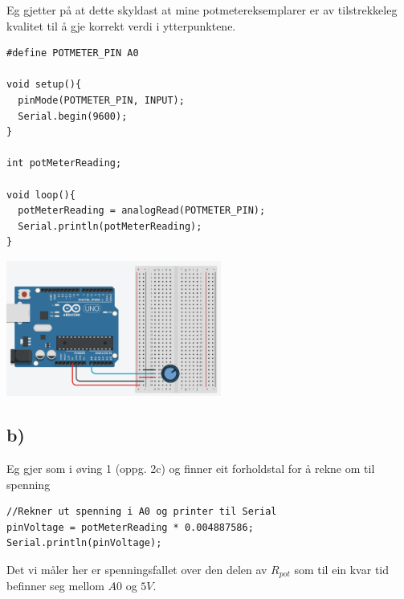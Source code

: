 \documentclass[12pt,a4paper]{article}
\begin{document}
    Eg gjetter på at dette skyldast at mine potmetereksemplarer er av tilstrekkeleg kvalitet til
    å gje korrekt verdi i ytterpunktene.
    
    \begin{lstlisting}[language=Arduino, basicstyle=\small]
#define POTMETER_PIN A0

void setup(){
  pinMode(POTMETER_PIN, INPUT);
  Serial.begin(9600);
}

int potMeterReading;

void loop(){
  potMeterReading = analogRead(POTMETER_PIN);
  Serial.println(potMeterReading);
}
    \end{lstlisting}
    \begin{center}
      \includegraphics[width=200pt]{01_2_b.png}
    \end{center}

    \subsection*{b)}
    Eg gjer som i øving 1 (oppg. 2c) og finner eit forholdstal for å rekne om til spenning
    \begin{lstlisting}[language=Arduino, basicstyle=\small]
//Rekner ut spenning i A0 og printer til Serial
pinVoltage = potMeterReading * 0.004887586;
Serial.println(pinVoltage);
    \end{lstlisting}
  Det vi måler her er spenningsfallet over den delen av $R_{pot}$ som til ein kvar
  tid befinner seg mellom $A0$ og $5V$.
\end{document}
